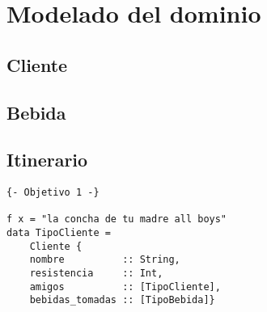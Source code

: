 







\clearpage
\tableofcontents
\clearpage 

\section{Modelado del dominio}

\subsection{Cliente}
\subsection{Bebida}
\subsection{Itinerario}


\lstset{style=haskell}
\begin{lstlisting}
{- Objetivo 1 -}

f x = "la concha de tu madre all boys"
data TipoCliente = 
    Cliente {
    nombre          :: String,
    resistencia     :: Int,
    amigos          :: [TipoCliente],
    bebidas_tomadas :: [TipoBebida]}
\end{lstlisting}

\clearpage
\printbibliography



\subsection{}
\emph{} 

~\\
